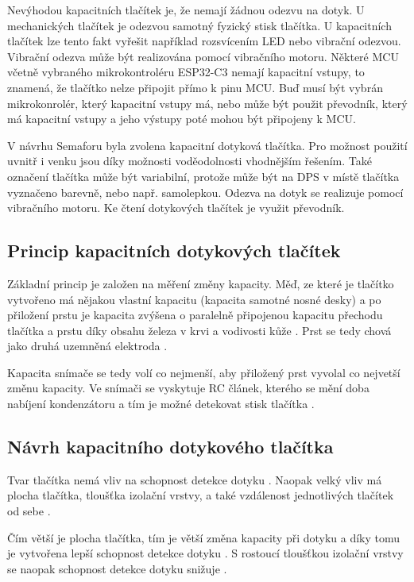 Nevýhodou kapacitních tlačítek je, že nemají žádnou odezvu na dotyk. U mechanických tlačítek je odezvou samotný fyzický 
stisk tlačítka. U kapacitních tlačítek lze tento fakt vyřešit například rozsvícením LED nebo vibrační odezvou. Vibrační 
odezva může být realizována pomocí vibračního motoru. Některé MCU včetně vybraného mikrokontroléru ESP32-C3 nemají kapacitní
vstupy, to znamená, že tlačítko nelze připojit přímo k pinu MCU. Buď musí být vybrán mikrokonrolér, který kapacitní vstupy má,
nebo může být použit převodník, který má kapacitní vstupy a jeho výstupy poté mohou být připojeny k MCU. 

V návrhu Semaforu byla zvolena kapacitní dotyková tlačítka. Pro možnost použití uvnitř i venku jsou díky možnosti voděodolnosti 
vhodnějším řešením. Také označení tlačítka může být variabilní, protože může být na DPS v místě tlačítka vyznačeno barevně, nebo 
např. samolepkou. Odezva na dotyk se realizuje pomocí vibračního motoru. Ke čtení dotykových tlačítek je využit převodník. 

\subsection{Princip kapacitních dotykových tlačítek}
Základní princip je založen na měření změny kapacity. Měď, ze které je tlačítko vytvořeno má
nějakou vlastní kapacitu (kapacita samotné nosné desky) a po přiložení prstu je kapacita zvýšena o paralelně 
připojenou kapacitu přechodu tlačítka a prstu díky obsahu železa v krvi a vodivosti kůže \cite{PrincipKapTl}. 
Prst se tedy chová jako druhá uzemněná elektroda \cite{PrincipKapTl}. 

Kapacita snímače se tedy volí co nejmenší, aby přiložený prst vyvolal co nejvetší změnu kapacity. Ve snímači se vyskytuje
RC článek, kterého se mění doba nabíjení kondenzátoru a tím je možné detekovat stisk tlačítka \cite{PrincipKapTl}. 

\subsection{Návrh kapacitního dotykového tlačítka}
Tvar tlačítka nemá vliv na schopnost detekce dotyku \cite{PrincipKapTl}. Naopak velký vliv má plocha tlačítka, tloušťka
izolační vrstvy, a také vzdálenost jednotlivých tlačítek od sebe \cite{PrincipKapTl}. 

Čím větší je plocha tlačítka, tím je větší změna kapacity při dotyku a díky tomu je vytvořena lepší schopnost detekce 
dotyku \cite{PrincipKapTl}. S rostoucí tloušťkou izolační vrstvy se naopak schopnost detekce dotyku snižuje \cite{PrincipKapTl}.

